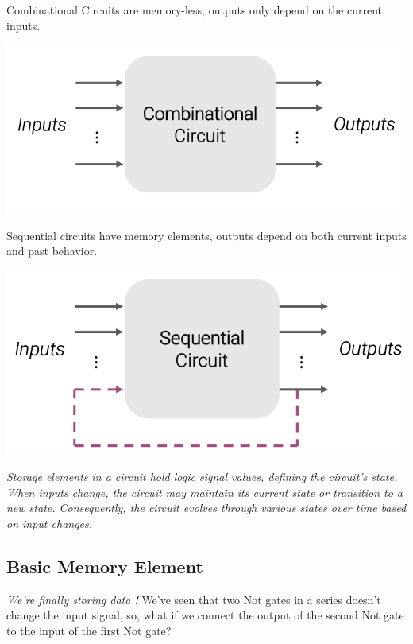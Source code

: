 \documentclass[12pt,openany, tikz,border=10pt]{book}
\begin{document}
\vspace*{10px}
\begin{minipage}{0.45\textwidth}
    Combinational Circuits are memory-less; outputs only depend on the current inputs.
    \begin{center}
        \includegraphics[width=\linewidth]{circuits/12.1.2.png}
    \end{center}
\end{minipage}
\hfill
\vline
\hfill
\begin{minipage}{0.45\textwidth}
	Sequential circuits have memory elements, outputs depend on both current inputs and past behavior.  
	\begin{center}
		\includegraphics[width=\linewidth]{circuits/12.1.2_2.png}
	\end{center}
\end{minipage}

\vspace*{10px}
\textit{
	Storage elements in a circuit hold logic signal values, defining the circuit's state. When inputs change, the circuit may maintain its current state or transition to a new state. Consequently, the circuit evolves through various states over time based on input changes.}


\subsection{Basic Memory Element}
\textit{We're finally storing data !} \newline
We've seen that two Not gates in a series doesn't change the input signal, so, what if we connect the output of the second Not gate to the input of the first Not gate? \newline
\end{document}
